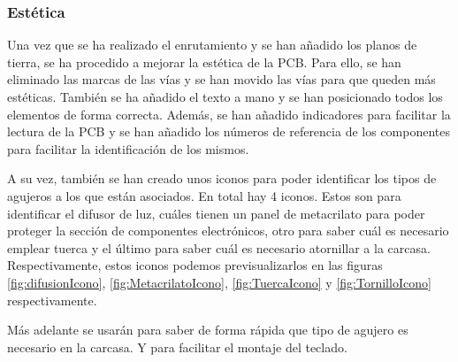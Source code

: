 \subsubsection{Estética}
Una vez que se ha realizado el enrutamiento y se han añadido los planos de tierra, se ha procedido a mejorar la estética de la \gls{PCB}. Para ello, se han eliminado las marcas de las vías y se han movido las vías para que queden más estéticas. También se ha añadido el texto a mano y se han posicionado todos los elementos de forma correcta. Además, se han añadido indicadores para facilitar la lectura de la \gls{PCB} y se han añadido los números de referencia de los componentes para facilitar la identificación de los mismos.

A su vez, también se han creado unos iconos para poder identificar los tipos de agujeros a los que están asociados. En total hay 4 iconos. Estos son para identificar el difusor de luz, cuáles tienen un panel de metacrilato para poder proteger la sección de componentes electrónicos, otro para saber cuál es necesario emplear tuerca y el último para saber cuál es necesario atornillar a la carcasa. Respectivamente, estos iconos podemos previsualizarlos en las figuras \ref{fig:difusionIcono}, \ref{fig:MetacrilatoIcono}, \ref{fig:TuercaIcono} y \ref{fig:TornilloIcono} respectivamente.

Más adelante se usarán para saber de forma rápida que tipo de agujero es necesario en la carcasa. Y para facilitar el montaje del teclado.

